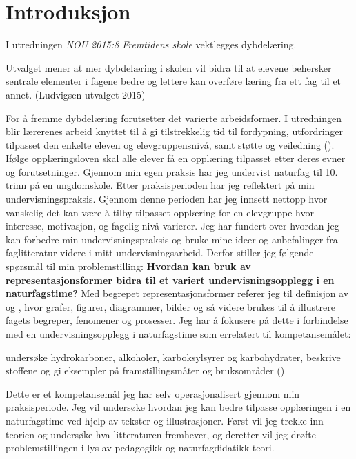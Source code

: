 \documentclass[main.tex]{subfiles}
\begin{document}
\section*{Introduksjon}
I utredningen \emph{NOU 2015:8 Fremtidens skole} vektlegges dybdelæring.
\begin{displayquote}
Utvalget mener at mer dybdelæring i skolen vil bidra til at elevene behersker sentrale elementer i fagene bedre og lettere kan overføre læring fra ett fag til et annet. (Ludvigsen-utvalget 2015)
\end{displayquote}
For å fremme dybdelæring forutsetter det varierte arbeidsformer. I utredningen blir lærerenes arbeid knyttet til å gi tilstrekkelig tid til fordypning, utfordringer tilpasset den enkelte eleven og elevgruppensnivå, samt støtte og veiledning ().
\newline\newline
Ifølge opplæringsloven skal alle elever få en opplæring tilpasset etter deres evner og forutsetninger. Gjennom min egen praksis har jeg undervist naturfag til 10. trinn på en ungdomskole. Etter praksisperioden har jeg reflektert på min undervisningspraksis. Gjennom denne perioden har jeg innsett nettopp hvor vanskelig det kan være å tilby tilpasset opplæring for en elevgruppe hvor interesse, motivasjon, og fagelig nivå varierer. Jeg har fundert over hvordan jeg kan forbedre min undervisningspraksis og bruke mine ideer og anbefalinger fra faglitteratur videre i mitt undervisningsarbeid. Derfor stiller jeg følgende spørsmål til min \mbox{problemstilling:}
\newline\newline
\textbf{Hvordan kan bruk av representasjonsformer bidra til et variert undervisningsopplegg i en naturfagstime?}
\newline\newline
Med begrepet representasjonsformer referer jeg til definisjon av  og , hvor grafer, figurer, diagrammer, bilder og så videre brukes til å illustrere fagets begreper, fenomener og prosesser. Jeg har å fokusere på dette i forbindelse med en undervisningsopplegg i naturfagstime som errelatert til kompetansemålet:
\begin{displayquote}
undersøke hydrokarboner, alkoholer, karboksylsyrer og karbohydrater, beskrive stoffene og gi eksempler på framstillingsmåter og bruksområder ()
\end{displayquote}
Dette er et kompetansemål jeg har selv operasjonalisert gjennom min praksisperiode. Jeg vil undersøke hvordan jeg kan bedre tilpasse opplæringen i en naturfagstime ved hjelp av tekster og illustrasjoner. Først vil jeg trekke inn teorien og undersøke hva litteraturen fremhever, og deretter vil jeg drøfte problemstillingen i lys av pedagogikk og naturfagdidatikk teori. 
\end{document}
